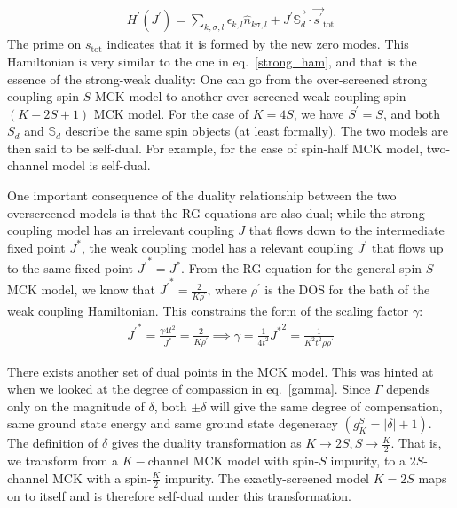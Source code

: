 \documentclass[12pt]{revtex4-2}
\begin{document}
\begin{equation}\begin{aligned}
	H^\prime(J^\prime) = \sum_{k,\sigma,l}\epsilon_{k,l} \hat n_{k\sigma,l} + J^\prime \vec{\mathbb{S}_d}\cdot\vec{s^\prime}_\text{tot}
\end{aligned}\end{equation}
The prime on \(s_\text{tot}\) indicates that it is formed by the new zero modes. This Hamiltonian is very similar to the one in eq.~\ref{strong_ham}, and that is the essence of the strong-weak duality: One can go from the over-screened strong coupling spin-\(S\) MCK model to another over-screened weak coupling spin-\((K-2S+1)\) MCK model. For the case of \(K=4S\), we have \(S^\prime = S\), and both \(S_d\) and \(\mathbb{S}_d\) describe the same spin objects (at least formally). The two models are then said to be self-dual. For example, for the case of spin-half MCK model, two-channel model is self-dual.

One important consequence of the duality relationship between the two overscreened models is that the RG equations are also dual; while the strong coupling model has an irrelevant coupling \(J\) that flows down to the intermediate fixed point \(J^*\), the weak coupling model has a relevant coupling \(J^\prime\) that flows up to the same fixed point \({J^\prime}^* = J^*\). From the RG equation for the general spin-\(S\) MCK model, we know that \({J^\prime}^* = \frac{2}{K \rho^\prime}\), where \(\rho^\prime\) is the DOS for the bath of the weak coupling Hamiltonian. This constrains the form of the scaling factor \(\gamma\):
\begin{equation}\begin{aligned}
	{J^\prime}^* = \frac{\gamma 4t^2}{J^*} = \frac{2}{K \rho^\prime} \implies \gamma = \frac{1}{4t^2} {J^*}^2 = \frac{1}{K^2 t^2 \rho \rho^\prime}
\end{aligned}\end{equation}

There exists another set of dual points in the MCK model. This was hinted at when we looked at the degree of compassion in eq.~\ref{gamma}. Since \(\Gamma\) depends only on the magnitude of \(\delta\), both \(\pm \delta\) will give the same degree of compensation, same ground state energy and same ground state degeneracy \(\left(g^S_K = |\delta|+1\right)\). The definition of \(\delta\) gives the duality transformation as \(K \to 2S, S \to \frac{K}{2}\). That is, we transform from a \(K-\)channel MCK model with spin-\(S\) impurity, to a \(2S\)-channel MCK with a spin-\(\frac{K}{2}\) impurity. The exactly-screened model \(K=2S\) maps on to itself and is therefore self-dual under this transformation.
\end{document}
